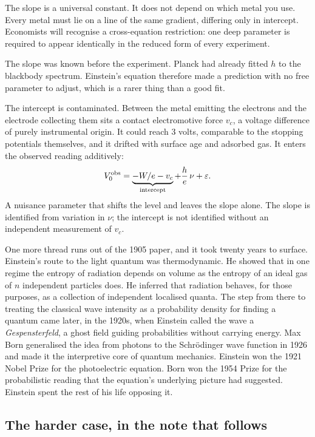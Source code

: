 \documentclass[11pt]{article}
\begin{document}
The slope is a universal constant.  It does not depend on which metal you use.
Every metal must lie on a line of the same gradient, differing only in
intercept.  Economists will recognise a cross-equation restriction: one deep
parameter is required to appear identically in the reduced form of every
experiment.

The slope was known before the experiment.  Planck had already fitted $h$ to
the blackbody spectrum.  Einstein's equation therefore made a prediction with
no free parameter to adjust, which is a rarer thing than a good fit.

The intercept is contaminated.  Between the metal emitting the electrons and
the electrode collecting them sits a contact electromotive force $v_c$, a
voltage difference of purely instrumental origin.  It could reach 3 volts,
comparable to the stopping potentials themselves, and it drifted with surface
age and adsorbed gas.  It enters the observed reading additively:
\begin{equation}\label{eq:obs}
  V_0^{\rm obs} = \underbrace{-W/e - v_c}_{\text{intercept}}
    + \frac{h}{e}\,\nu + \varepsilon .
\end{equation}
A nuisance parameter that shifts the level and leaves the slope alone.  The
slope is identified from variation in $\nu$; the intercept is not identified
without an independent measurement of $v_c$.

One more thread runs out of the 1905 paper, and it took twenty years to
surface.  Einstein's route to the light quantum was thermodynamic.  He showed that in one regime the entropy of
radiation depends on volume as the entropy of an ideal gas of $n$ independent
particles does.  He inferred that radiation behaves, for those purposes, as a
collection of independent localised quanta.  The step
from there to treating the classical wave intensity as a probability density
for finding a quantum came later, in the 1920s, when Einstein called the wave
a \emph{Gespensterfeld}, a ghost field guiding probabilities without carrying
energy.  Max Born generalised the idea from photons to the Schr\"odinger wave
function in 1926 \citep{Born1926} and made it the interpretive core of quantum
mechanics.  Einstein won the 1921 Nobel Prize for the photoelectric equation.
Born won the 1954 Prize for the probabilistic reading that the equation's
underlying picture had suggested.  Einstein spent the rest of his life
opposing it.

\subsection*{The harder case, in the note that follows}
\end{document}
